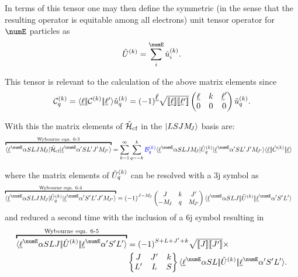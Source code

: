 \documentclass{article}
\begin{document}
    In terms of this tensor one may then define the symmetric (in the sense that the resulting operator is equitable among all electrons) unit tensor operator for $\numE$ particles as
    \begin{equation}
        \hat{U}^{(k)} = \sum_{i}^{\numE} \op{u}^{(k)}_i.
    \end{equation}

    This tensor is relevant to the calculation of the above matrix elements since 
    \begin{equation}
        \mathcal{C}^{(k)}_{q} = \langle \underbar{$\ell$}|\!|\mathcal{C}^{(k)}|\!|\underbar{$\ell$}{'}\rangle \hat{u}^{(k)}_q 
            = {(-1)}^{\underbar{$\ell$}}
            \sqrt{[\![\underbar{$\ell$}]\!][\![\underbar{$\ell$}{'}]\!]}
            \begin{pmatrix} \underbar{$\ell$} & k & \underbar{$\ell$}' \\ 0 & 0 & 0 \end{pmatrix} \hat{u}^{(k)}_q.
    \end{equation}

    With this the matrix elements of $\hat{\mathcal{H}}_\text{cf}$ in the $|LSJM_{\!{J}}\rangle$ basis are: 
    \begin{align}
        \overbracket{\braopket{\lorb^\numE \alpha SLJ \Msub{J}}{\hamCrystalFieldSymbol}{\lorb^\numE \alpha'S L' J' \Msub{J'}}}^{\text{Wybourne eqn. 6-3}} &= \sum_{k=1}^\infty\sum_{q=-k}^k    
        \Bcomplexkq{k}{q} 
            \braopket{\lorb^\numE \alpha SLJ\Msub{J}}
                {\op{U}^{(k)}_q}
                {\lorb^\numE \alpha'SL'J'\Msub{J'}} 
            \redbraopket{\lorb}
                {\op{C}^{(k)}}
                {\lorb} 
    \label{HCFsum}
    \end{align}

    where the matrix elements of $\hat{U}^{(k)}_q$ can be resolved with a 3j symbol as
    \begin{align}
        \overbracket{\braopket{\lorb^\numE \alpha S L J \Msub{J}}
            {\op{U}^{(k)}_q}
            {\lorb^\numE \alpha' S' L' J' \Msub{J'}}}^
            {\text{Wybourne eqn. 6-4}}
            &= 
            \phaser{J-\Msub{J}}
            \threej{J}{k}{J'}
                {-\Msub{J}}{q}{\Msub{J'}}
        \redbraopket{\lorb^\numE \alpha S L J}
                {\op{U}^{(k)}}
                {\lorb^\numE \alpha' S' L'}
    \end{align}
    and reduced a second time with the inclusion of a 6j symbol resulting in
    \begin{align}
        \nonumber \overbracket{\redbraopket{\lorb^\numE \alpha S L J}
            {\op{U}^{(k)}}
            {\lorb^\numE \alpha' S' L'}}^
            {\text{Wybourne eqn. 6-5}}
        &= 
        \phaser{S+L+J'+k} 
        \sqrt{\tpobraket{J}\tpobraket{J'}} \times \\
        & \sixj{J}{J'}{k}{L'}{L}{S}
        \redbraopket{\lorb^\numE \alpha S L}
            {\op{U}^{(k)}}
            {\lorb^\numE \alpha' S' L'}.
    \end{align}
\end{document}
